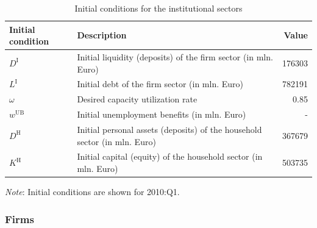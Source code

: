 \begin{table}[!htb]
	\caption{Initial conditions for the institutional sectors}
	\label{table:sector_initial_values}
	\centering
		\begin{tabular}{llr}
			\toprule
			Initial condition & Description & Value \\
			\midrule
			$D^{\mathrm{I}}$ & Initial liquidity (deposits) of the firm sector (in mln. Euro) & 176303 \\
			$L^{\mathrm{I}}$ & Initial debt of the firm sector (in mln. Euro) & 782191\\
			$\omega$ & Desired capacity utilization rate & 0.85 \\
			$w^{\mathrm{UB}}$ & Initial unemployment benefits (in mln. Euro) & -\\
			$D^{\mathrm{H}}$ & Initial personal assets (deposits) of the household sector (in mln. Euro) & 367679 \\
			$K^{\mathrm{H}}$ & Initial capital (equity) of the household sector (in mln. Euro) & 503735 \\
			\bottomrule
		\end{tabular}
	\begin{tablenotes}
		\footnotesize \item \textit{Note}: Initial conditions are shown for 2010:Q1. 
	\end{tablenotes}
\end{table}

\subsubsection{Firms}
\label{subsec:firms_initialconditions}


